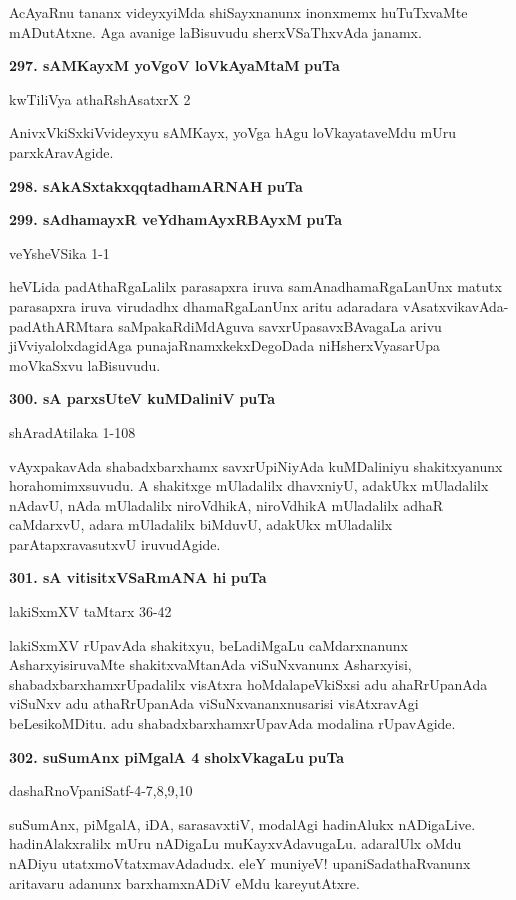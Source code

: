 {\smallskip
AcAyaRnu tananx videyxyiMda shiSayxnanunx inonxmemx huTuTxvaMte mADutAtxne. Aga avanige laBisu\-vudu sherxVSaThxvAda janamx.

\medskip
\textbf{297. sAMKayxM yoVgoV loVkAyaMtaM} \hfill {\bf puTa \pageref{98}}

\hfill kwTiliVya athaRshAsatxrX 2

\smallskip
AnivxVkiSxkiVvideyxyu sAMKayx, yoVga hAgu loVkayataveMdu mUru parxkAravAgide.

\medskip
\noindent
\textbf{298. sAkASxtakxqqtadhamARNAH} \hfill {\bf puTa \pageref{106}}


\noindent
\textbf{299. sAdhamayxR veYdhamAyxRBAyxM}  \hfill {\bf puTa \pageref{41}}

\hfill veYsheVSika 1-1

\smallskip
heVLida padAthaRgaLalilx parasapxra iruva samAnadhamaRgaLanUnx matutx para\-sapxra iruva virudadhx dhamaR\-gaLanUnx aritu adaradara vAsatxvikavAda-padAthARMtara saMpakaRdiMdAguva savxrUpasavxBAvagaLa arivu jiVviyalolxdagidAga punajaRnamxkekxDegoDada niHsherxVyasarUpa moVkaSxvu laBisuvudu.

\medskip
\noindent
\textbf{300. sA parxsUteV kuMDaliniV} \hfill {\bf puTa \pageref{59}}

\hfill shAradAtilaka 1-108

\smallskip
vAyxpakavAda shabadxbarxhamx savxrUpiNiyAda kuMDaliniyu shakitxyanunx hora\-homimxsuvudu. A shakitx\-ge mUladalilx dhavxniyU, adakUkx mUladalilx nAdavU, nAda mUladalilx niroVdhikA, niroV\-dhikA mUla\-dalilx adhaR caMdarxvU, adara mUladalilx biMduvU, adakUkx mUladalilx parAtapxravasutxvU iruvu\-dAgide.

\medskip
\noindent
\textbf{301. sA vitisitxVSaRmANA hi} \hfill {\bf puTa \pageref{157}}

\hfill lakiSxmXV taMtarx 36-42

\smallskip
lakiSxmXV rUpavAda shakitxyu, beLadiMgaLu caMdarxnanunx AsharxyisiruvaMte shakitxvaMtanAda viSuNx\-vanunx Asharxyisi, shabadxbarxhamxrUpadalilx visAtxra hoMdalapeVkiSxsi adu ahaRrUpanAda viSuNxv adu athaR\-rUpa\-nAda viSuNxvananxnusarisi visAtxravAgi beLesikoMDitu. adu shabadxbarxhamxrUpavAda modalina rUpa\-vAgide.

\medskip
\noindent
\textbf{302. suSumAnx piMgalA 4 sholxVkagaLu} \hfill {\bf puTa \pageref{82}}

\hfill dashaRnoVpaniSatf-4-7,8,9,10

\smallskip
suSumAnx, piMgalA, iDA, sarasavxtiV, modalAgi hadinAlukx nADigaLive. hadinAlakxralilx mUru nADigaLu muKayxvAdavugaLu. adaralUlx oMdu nADiyu utatxmoVtatxmavAdadudx. eleY muniyeV! upa\-niSadathaRvanunx aritavaru adanunx barxhamxnADiV eMdu kareyutAtxre.

}
